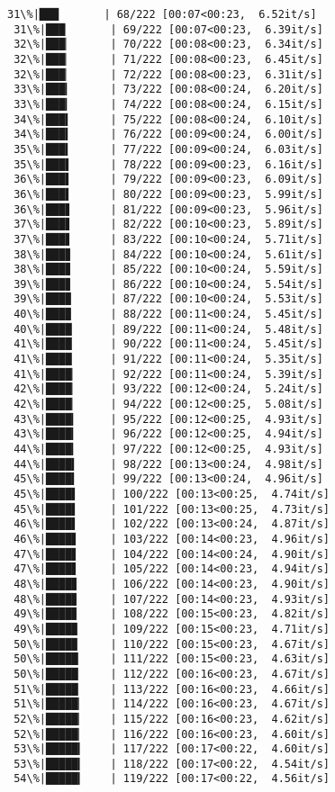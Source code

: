 \documentclass[11pt]{article}
\begin{document}
\begin{Verbatim}[commandchars=\\\{\}]
 31\%|███       | 68/222 [00:07<00:23,  6.52it/s]
 31\%|███       | 69/222 [00:07<00:23,  6.39it/s]
 32\%|███▏      | 70/222 [00:08<00:23,  6.34it/s]
 32\%|███▏      | 71/222 [00:08<00:23,  6.45it/s]
 32\%|███▏      | 72/222 [00:08<00:23,  6.31it/s]
 33\%|███▎      | 73/222 [00:08<00:24,  6.20it/s]
 33\%|███▎      | 74/222 [00:08<00:24,  6.15it/s]
 34\%|███▍      | 75/222 [00:08<00:24,  6.10it/s]
 34\%|███▍      | 76/222 [00:09<00:24,  6.00it/s]
 35\%|███▍      | 77/222 [00:09<00:24,  6.03it/s]
 35\%|███▌      | 78/222 [00:09<00:23,  6.16it/s]
 36\%|███▌      | 79/222 [00:09<00:23,  6.09it/s]
 36\%|███▌      | 80/222 [00:09<00:23,  5.99it/s]
 36\%|███▋      | 81/222 [00:09<00:23,  5.96it/s]
 37\%|███▋      | 82/222 [00:10<00:23,  5.89it/s]
 37\%|███▋      | 83/222 [00:10<00:24,  5.71it/s]
 38\%|███▊      | 84/222 [00:10<00:24,  5.61it/s]
 38\%|███▊      | 85/222 [00:10<00:24,  5.59it/s]
 39\%|███▊      | 86/222 [00:10<00:24,  5.54it/s]
 39\%|███▉      | 87/222 [00:10<00:24,  5.53it/s]
 40\%|███▉      | 88/222 [00:11<00:24,  5.45it/s]
 40\%|████      | 89/222 [00:11<00:24,  5.48it/s]
 41\%|████      | 90/222 [00:11<00:24,  5.45it/s]
 41\%|████      | 91/222 [00:11<00:24,  5.35it/s]
 41\%|████▏     | 92/222 [00:11<00:24,  5.39it/s]
 42\%|████▏     | 93/222 [00:12<00:24,  5.24it/s]
 42\%|████▏     | 94/222 [00:12<00:25,  5.08it/s]
 43\%|████▎     | 95/222 [00:12<00:25,  4.93it/s]
 43\%|████▎     | 96/222 [00:12<00:25,  4.94it/s]
 44\%|████▎     | 97/222 [00:12<00:25,  4.93it/s]
 44\%|████▍     | 98/222 [00:13<00:24,  4.98it/s]
 45\%|████▍     | 99/222 [00:13<00:24,  4.96it/s]
 45\%|████▌     | 100/222 [00:13<00:25,  4.74it/s]
 45\%|████▌     | 101/222 [00:13<00:25,  4.73it/s]
 46\%|████▌     | 102/222 [00:13<00:24,  4.87it/s]
 46\%|████▋     | 103/222 [00:14<00:23,  4.96it/s]
 47\%|████▋     | 104/222 [00:14<00:24,  4.90it/s]
 47\%|████▋     | 105/222 [00:14<00:23,  4.94it/s]
 48\%|████▊     | 106/222 [00:14<00:23,  4.90it/s]
 48\%|████▊     | 107/222 [00:14<00:23,  4.93it/s]
 49\%|████▊     | 108/222 [00:15<00:23,  4.82it/s]
 49\%|████▉     | 109/222 [00:15<00:23,  4.71it/s]
 50\%|████▉     | 110/222 [00:15<00:23,  4.67it/s]
 50\%|█████     | 111/222 [00:15<00:23,  4.63it/s]
 50\%|█████     | 112/222 [00:16<00:23,  4.67it/s]
 51\%|█████     | 113/222 [00:16<00:23,  4.66it/s]
 51\%|█████▏    | 114/222 [00:16<00:23,  4.67it/s]
 52\%|█████▏    | 115/222 [00:16<00:23,  4.62it/s]
 52\%|█████▏    | 116/222 [00:16<00:23,  4.60it/s]
 53\%|█████▎    | 117/222 [00:17<00:22,  4.60it/s]
 53\%|█████▎    | 118/222 [00:17<00:22,  4.54it/s]
 54\%|█████▎    | 119/222 [00:17<00:22,  4.56it/s]

\end{Verbatim}
\end{document}

